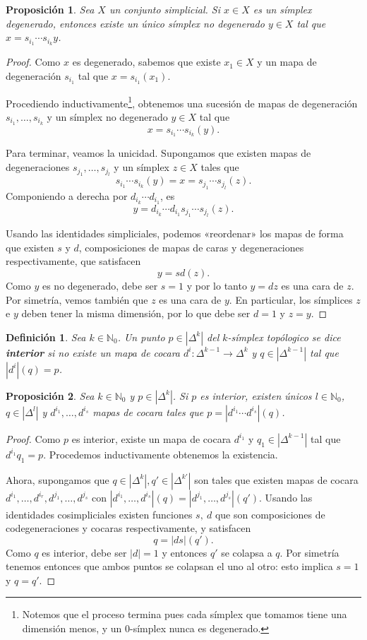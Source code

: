 \documentclass[11pt]{report}
\theoremstyle{colored}
\newtheorem{definition}{Definición}[section]
\newtheorem{proposition}{Proposición}[section]
\newcommand{\N}{\mathbb{N}}
\renewcommand{\ss}[1]{\Delta^{#1}}
\begin{document}
\begin{proposition} Sea $X$ un conjunto simplicial. Si $x \in X$ es un símplex degenerado, entonces existe un único símplex no degenerado $y \in X$ tal que $x = s_{i_1} \cdots s_{i_k}y$.
\end{proposition}
\begin{proof} Como $x$ es degenerado, sabemos que existe $x_1 \in X$ y un mapa de degeneración $s_{i_1}$ tal que $x = s_{i_1}(x_1)$. 

Procediendo inductivamente\footnote{Notemos que el proceso termina pues cada símplex que tomamos tiene una dimensión menos, y un $0$-símplex nunca es degenerado.}, obtenemos una sucesión de mapas de degeneración $s_{i_1},\dots, s_{i_k}$ y un símplex no degenerado $y \in X$ tal que
\[
x = s_{i_1} \cdots s_{i_k}(y).
\]

Para terminar, veamos la unicidad. Supongamos que existen mapas de degeneraciones $s_{j_1}, \dots, s_{j_l}$ y un símplex $z \in X$ tales que
\[
s_{i_1} \cdots s_{i_k}(y) = x = s_{j_1} \cdots s_{j_l}(z).
\]
Componiendo a derecha por $d_{i_k} \cdots d_{i_1}$, es
\[
y = d_{i_k} \cdots d_{i_1}s_{j_1} \cdots s_{j_l}(z).
\]

Usando las identidades simpliciales, podemos «reordenar» los mapas de forma que existen $s$ y $d$, composiciones de mapas de caras y degeneraciones respectivamente, que satisfacen
\[
y = sd(z).
\]
Como $y$ es no degenerado, debe ser $s = 1$ y por lo tanto $y = dz$ es una cara de $z$. Por simetría, vemos también que $z$ es una cara de $y$. En particular, los símplices $z$ e $y$ deben tener la misma dimensión, por lo que debe ser $d = 1$ y $z = y$. 
\end{proof}

\begin{definition} Sea $k \in \N_0$. Un punto $p \in |\ss{k}|$ del $k$-símplex topólogico se dice \textbf{interior} si no existe un mapa de cocara $d^i : \ss{k-1} \to \ss{k}$ y $q \in |\ss{k-1}|$ tal que $|d^i|(q) = p$.
\end{definition}

\begin{proposition} Sea $k \in \N_0$ y $p \in |\ss{k}|$. Si $p$ es interior, existen únicos $l \in \N_0$, $q \in |\ss{l}|$ y $d^{i_1}, \dots, d^{i_s}$ mapas de cocara tales que $p = |d^{i_1} \cdots d^{i_s}|(q)$.
\end{proposition}
\begin{proof} Como $p$ es interior, existe un mapa de cocara $d^{i_1}$ y $q_1 \in |\Delta^{k-1}|$ tal que $d^{i_1}q_1 = p$. Procedemos inductivamente obtenemos la existencia. 

Ahora, supongamos que $q \in |\ss{k}|,q'\in|\ss{k'}|$ son tales que existen mapas de cocara $d^{i_1}, \dots, d^{i_r},d^{j_1}, \dots, d^{j_s}$ con $|d^{i_1}, \dots, d^{i_s}|(q) = |d^{j_1}, \dots, d^{j_s}|(q')$. Usando las identidades cosimpliciales existen funciones $s, \ d$ que son composiciones de codegeneraciones y cocaras respectivamente, y satisfacen
\[
q = |ds|(q').
\]
Como $q$ es interior, debe ser $|d| = 1$ y entonces $q'$ se colapsa a $q$. Por simetría tenemos entonces que ambos puntos se colapsan el uno al otro: esto implica $s = 1$ y $q  = q'$.
\end{proof}
\end{document}
